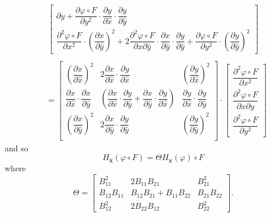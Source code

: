 \begin{align*}
\begin{bmatrix}
{      \partial y} + \dfrac{\partial \varphi\circ F}{\partial y^2}\cdot
      \dfrac{\partial y}{\partial \hat{x}} \cdot \dfrac{\partial y}{\partial
      \hat{y}} \\[1em]
    \dfrac{\partial^2 \varphi\circ F}{\partial x^2}\cdot \left(\dfrac{\partial
      x}{\partial \hat{y}}\right)^2 + 2 \dfrac{\partial^2 \varphi\circ F}{\partial x
      \partial \hat{y}} \cdot \dfrac{\partial x}{\partial \hat{y}} \cdot
      \dfrac{\partial y}{\partial \hat{y}} + \dfrac{\partial \varphi\circ
      F}{\partial y^2}\cdot \left(\dfrac{\partial y}{\partial \hat{y}}\right)^2 
  \end{bmatrix} \\
\end{align*}
\begin{align*}
  &= \begin{bmatrix}
    \left(\dfrac{\partial x}{\partial \hat{x}}\right)^2 
      & 2 \dfrac{\partial x}{\partial \hat{x}}\cdot \dfrac{\partial y}{\partial \hat{x}} 
      & \left(\dfrac{\partial y}{\partial \hat{x}}\right)^2 \\[1em]
    \dfrac{\partial x}{\partial \hat{x}}\cdot \dfrac{\partial x}{\partial \hat{y}}
      & \left(\dfrac{\partial x}{\partial \hat{x}}\cdot \dfrac{\partial y}{\partial
      \hat{y}} + \dfrac{\partial x}{\partial \hat{y}}\cdot
      \dfrac{\partial y}{\partial \hat{x}} \right)
      & \dfrac{\partial y}{\partial \hat{x}} \cdot \dfrac{\partial y}{\partial \hat{y}} \\[1em]
    \left(\dfrac{\partial x}{\partial \hat{y}}\right)^2 
      & 2 \dfrac{\partial x}{\partial \hat{y}}\cdot \dfrac{\partial y}{\partial \hat{y}} 
      & \left(\dfrac{\partial y}{\partial \hat{y}}\right)^2 \\[1em]
  \end{bmatrix}\cdot \begin{bmatrix}
    \dfrac{\partial^2 \varphi\circ F}{\partial x^2} \\[1em]
    \dfrac{\partial^2 \varphi\circ F}{\partial x \partial y} \\[1em]
    \dfrac{\partial^2 \varphi\circ F}{\partial y^2} 
  \end{bmatrix}
\end{align*}
and so 
\begin{equation}
  H_{\mathbf{\hat{x}}}(\varphi\circ F) = \Theta H_{\mathbf{x}}(\varphi)\circ F 
  \label{eqn:Hessian}
\end{equation}
where
\begin{equation*}
  \Theta = \begin{bmatrix}
    B_{11}^2 & 2B_{11}B_{21} & B_{21}^2 \\[0.5em]
    B_{12}B_{11} & B_{12}B_{21} + B_{11}B_{22} & B_{21}B_{22} \\[0.5em]
    B_{12}^2 & 2B_{22}B_{12} & B_{22}^2 
  \end{bmatrix}.
\end{equation*}

